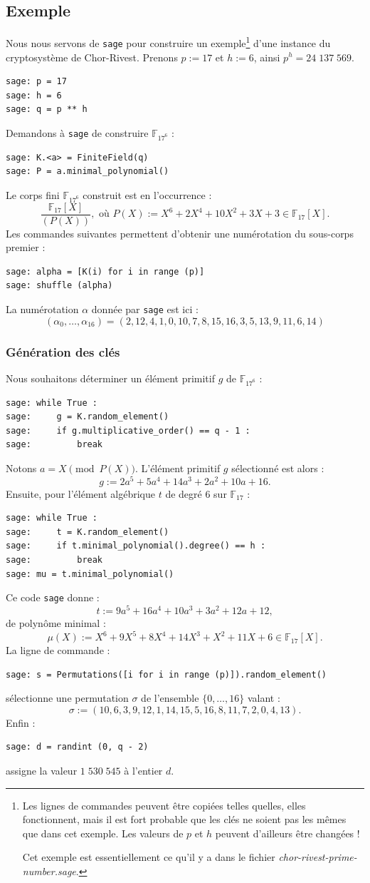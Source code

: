 \documentclass[a4paper, titlepage, 11pt]{article}
\theoremstyle{definition}
\theoremstyle{remark}
\def\gf #1{\mathbb{F}_{#1}}
\begin{document}
\subsection{Exemple}
Nous nous servons de \verb|sage| pour construire un exemple\footnote{Les lignes de commandes peuvent être copiées telles quelles, elles fonctionnent, mais il est fort probable que les clés ne soient pas les mêmes que dans cet exemple. Les valeurs de $p$ et $h$ peuvent d'ailleurs être changées !

Cet exemple est essentiellement ce qu'il y a dans le fichier \textit{chor-rivest-prime-number.sage}.} d'une instance du cryptosystème de Chor-Rivest. Prenons $p := 17$ et $h := 6$, ainsi $p^h = 24\;137\;569$.
\begin{verbatim}
sage: p = 17
sage: h = 6
sage: q = p ** h
\end{verbatim}
Demandons à \verb|sage| de construire $\gf{17^6}$ :
\begin{verbatim}
sage: K.<a> = FiniteField(q)
sage: P = a.minimal_polynomial()
\end{verbatim}
Le corps fini $\gf{17^6}$ construit est en l’occurrence :
$$\frac{\gf{17}[X]}{(P(X))}, \text{ où } P(X) := X^6 + 2X^4 + 10 X^2 +3X +3\in  \gf{17}[X].$$
Les commandes suivantes permettent d'obtenir une numérotation du sous-corps premier :
\begin{verbatim}
sage: alpha = [K(i) for i in range (p)]
sage: shuffle (alpha)
\end{verbatim}
La numérotation $\alpha$ donnée par \verb|sage| est ici :
$$(\alpha_0, \dots, \alpha_{16}) = (2, 12, 4, 1, 0, 10, 7, 8, 15, 16, 3, 5, 13, 9, 11, 6, 14)$$
\subsubsection{Génération des clés}
Nous souhaitons déterminer un élément primitif $g$ de $\gf{17^6}$ :
\begin{verbatim}
sage: while True :
sage:     g = K.random_element()
sage:     if g.multiplicative_order() == q - 1 :
sage:         break
\end{verbatim}
Notons $a = X \pmod{P(X)}$. L'élément primitif $g$ sélectionné est alors :
$$g := 2a^5 + 5a^4 + 14a^3 + 2a^2 + 10a + 16.$$
Ensuite, pour l'élément algébrique $t$ de degré $6$ sur $\gf{17}$ :
\begin{verbatim}
sage: while True :
sage:     t = K.random_element()
sage:     if t.minimal_polynomial().degree() == h :
sage:         break
sage: mu = t.minimal_polynomial()
\end{verbatim}
Ce code \verb|sage| donne :
$$t := 9a^5 + 16a^4 + 10a^3 + 3a^2 + 12a + 12,$$
de polynôme minimal :
$$\mu(X) := X^6 + 9X^5 + 8X^4 + 14X^3 + X^2 + 11X + 6\in\gf{17}[X].$$
La ligne de commande :
\begin{verbatim}
sage: s = Permutations([i for i in range (p)]).random_element()
\end{verbatim}
sélectionne une permutation $\sigma$ de l'ensemble $\{0, \dots, 16\}$ valant :
$$\sigma := (10, 6, 3, 9, 12, 1, 14, 15, 5, 16, 8, 11, 7, 2, 0, 4, 13).$$
Enfin : 
\begin{verbatim}
sage: d = randint (0, q - 2)
\end{verbatim}
assigne la valeur $1\;530\;545$ à l'entier $d$.
\end{document}
